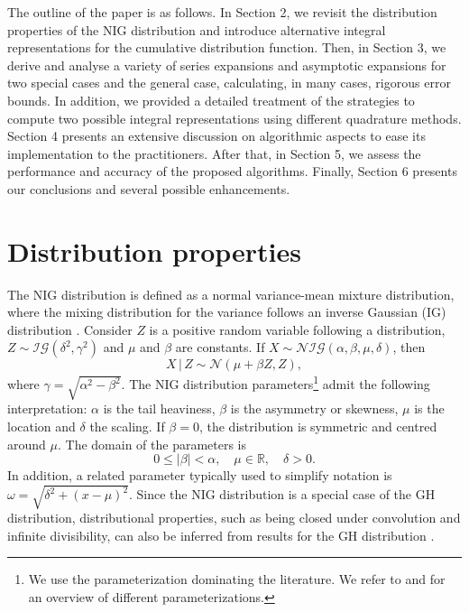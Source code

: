 \documentclass[10pt,a4paper,oneside]{article}
\numberwithin{equation}{section}
\begin{document}
The outline of the paper is as follows. In Section 2, we revisit the distribution properties of the NIG distribution and introduce alternative integral representations for the cumulative distribution function. Then, in Section 3, we derive and analyse a variety of series expansions and asymptotic expansions for two special cases and the general case, calculating, in many cases, rigorous error bounds. In addition, we provided a detailed treatment of the strategies to compute two possible integral representations using different quadrature methods. Section 4 presents an extensive discussion on algorithmic aspects to ease its implementation to the practitioners. After that, in Section 5, we assess the performance and accuracy of the proposed algorithms. Finally, Section 6 presents our conclusions and several possible enhancements.

\section{Distribution properties}

The NIG distribution is defined as a normal variance-mean mixture distribution, where the mixing distribution for the variance follows an inverse Gaussian (IG) distribution \cite[\S 9]{Paolella2007}. Consider $Z$ is a positive random variable following a distribution, $Z \sim \mathcal{IG}(\delta^2, \gamma^2)$ and $\mu$ and $\beta$ are constants. If $X \sim \mathcal{NIG}(\alpha, \beta, \mu, \delta)$, then
\begin{equation}
X \,|\, Z \sim \mathcal{N}(\mu + \beta Z, Z),
\end{equation}
where $\gamma = \sqrt{\alpha^2 - \beta^2}$.
The NIG distribution parameters\footnote{We use the parameterization dominating the literature. We refer to \cite{Paolella2007} and \cite{Prause1999} for an overview of different parameterizations.} admit the following interpretation: $\alpha$ is the tail heaviness, $\beta$ is the asymmetry or skewness, $\mu$ is the location and $\delta$ the scaling. If $\beta = 0$, the distribution is symmetric and centred around $\mu$. The domain of the parameters is
\begin{equation}
0 \le |\beta| < \alpha, \quad \mu \in \mathbb{R}, \quad \delta  > 0.
\end{equation}
In addition, a related parameter typically used to simplify notation is $\omega = \sqrt{\delta^2 + (x-\mu)^2}$.
Since the NIG distribution is a special case of the GH distribution, distributional properties, such as being closed under convolution and infinite divisibility, can also be inferred from results for the GH distribution \cite{Paolella2007}.
\end{document}
